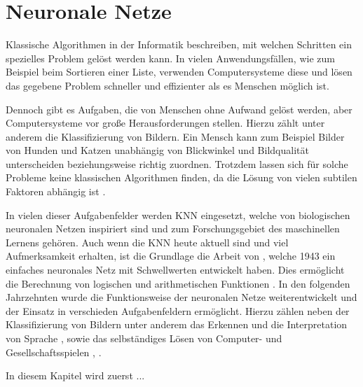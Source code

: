 \section{Neuronale Netze}
Klassische Algorithmen in der Informatik beschreiben, mit welchen Schritten ein spezielles Problem gelöst werden kann. In vielen Anwendungsfällen, wie zum Beispiel beim Sortieren einer Liste, verwenden Computersysteme diese und lösen das gegebene Problem schneller und effizienter als es Menschen möglich ist. 

Dennoch gibt es Aufgaben, die von Menschen ohne Aufwand gelöst werden, aber Computersysteme vor große Herausforderungen stellen. Hierzu zählt unter anderem die Klassifizierung von Bildern. Ein Mensch kann zum Beispiel Bilder von Hunden und Katzen unabhängig von Blickwinkel und Bildqualität unterscheiden beziehungsweise richtig zuordnen. Trotzdem lassen sich für solche Probleme keine klassischen Algorithmen finden, da die Lösung von vielen subtilen Faktoren abhängig ist \cite{kriesel2008kleiner}.

In vielen dieser Aufgabenfelder werden \ac{KNN} eingesetzt, welche von biologischen neuronalen Netzen inspiriert sind und zum Forschungsgebiet des maschinellen Lernens gehören. Auch wenn die \ac{KNN} heute aktuell sind und viel Aufmerksamkeit erhalten, ist die Grundlage die Arbeit von \citeauthor{mcculloch1943logical}, welche 1943 ein einfaches neuronales Netz mit Schwellwerten entwickelt haben. Dies ermöglicht die Berechnung von logischen und arithmetischen Funktionen \cite{mcculloch1943logical}. In den folgenden Jahrzehnten wurde die Funktionsweise der neuronalen Netze weiterentwickelt und der Einsatz in verschieden Aufgabenfeldern ermöglicht. Hierzu zählen neben der Klassifizierung von Bildern \cite{krizhevsky2012imagenet} unter anderem das Erkennen und die Interpretation von Sprache \cite{hinton2012deep}, \cite{andor2016globally} sowie das selbständiges Lösen von Computer- und Gesellschaftsspielen \cite{mnih2013playing}, \cite{silver2016mastering}. 

In diesem Kapitel wird zuerst ...
